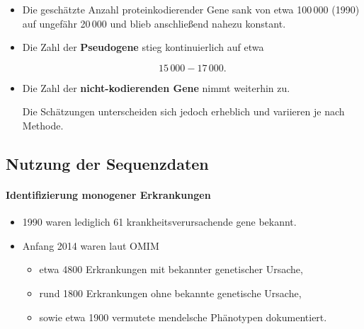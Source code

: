 \begin{itemize}

    \item Die geschätzte Anzahl
    proteinkodierender Gene
    sank von etwa
    100\,000 (1990)
    auf ungefähr
    20\,000
    und blieb anschließend nahezu konstant.

    \item Die Zahl der
    \textbf{Pseudogene}
    stieg kontinuierlich auf etwa

    \[
        15\,000 - 17\,000.
    \]

    \item Die Zahl der
    \textbf{nicht-kodierenden Gene}
    nimmt weiterhin zu.

    Die Schätzungen unterscheiden sich jedoch
    erheblich und variieren je nach Methode.
\end{itemize}



\subsection*{Nutzung der Sequenzdaten}\label{subsec:nutzung-der-sequenzdaten}

\paragraph{Identifizierung monogener Erkrankungen}

\begin{itemize}

    \item 1990 waren lediglich
    61 krankheitsverursachende \gls{gen}e bekannt.

    \item Anfang 2014 waren laut OMIM

    \begin{itemize}
        \item etwa 4800 Erkrankungen
        mit bekannter genetischer Ursache,

        \item rund 1800 Erkrankungen
        ohne bekannte genetische Ursache,

        \item sowie etwa 1900 vermutete
        mendelsche Phänotypen
        dokumentiert.
    \end{itemize}

\end{itemize}


